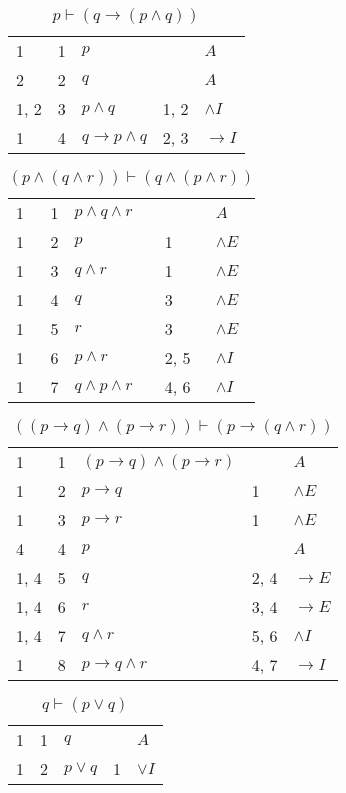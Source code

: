 \documentclass{article}
\begin{document}
\begin{table}[htbp]\caption*{$p ⊢ (q→(p∧q))$}\centering\begin{tabular}{lrlll}
		{1} & 1 & $p$ & {} & $A$ \\
		{2} & 2 & $q$ & {} & $A$ \\
		{1, 2} & 3 & $p∧q$ & {1, 2} & $∧I$ \\
		{1} & 4 & $q→p∧q$ & {2, 3} & $→I$ \\
	\end{tabular}
\end{table}
\begin{table}[htbp]\caption*{$(p∧(q∧r)) ⊢ (q∧(p∧r))$}\centering\begin{tabular}{lrlll}
		{1} & 1 & $p∧q∧r$ & {} & $A$ \\
		{1} & 2 & $p$ & {1} & $∧E$ \\
		{1} & 3 & $q∧r$ & {1} & $∧E$ \\
		{1} & 4 & $q$ & {3} & $∧E$ \\
		{1} & 5 & $r$ & {3} & $∧E$ \\
		{1} & 6 & $p∧r$ & {2, 5} & $∧I$ \\
		{1} & 7 & $q∧p∧r$ & {4, 6} & $∧I$ \\
	\end{tabular}
\end{table}\begin{table}[htbp]\caption*{$((p→q)∧(p→r)) ⊢ (p→(q∧r))$}\centering\begin{tabular}{lrlll}
		{1} & 1 & $(p→q)∧(p→r)$ & {} & $A$ \\
		{1} & 2 & $p→q$ & {1} & $∧E$ \\
		{1} & 3 & $p→r$ & {1} & $∧E$ \\
		{4} & 4 & $p$ & {} & $A$ \\
		{1, 4} & 5 & $q$ & {2, 4} & $→E$ \\
		{1, 4} & 6 & $r$ & {3, 4} & $→E$ \\
		{1, 4} & 7 & $q∧r$ & {5, 6} & $∧I$ \\
		{1} & 8 & $p→q∧r$ & {4, 7} & $→I$ \\
	\end{tabular}
\end{table}
\begin{table}[htbp]\caption*{$q ⊢ (p∨q)$}\centering\begin{tabular}{lrlll}
		{1} & 1 & $q$ & {} & $A$ \\
		{1} & 2 & $p∨q$ & {1} & $∨I$ \\
	\end{tabular}
\end{table}
\end{document}
